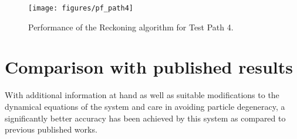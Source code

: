 \begin{figure}
    \centering
    \texttt{[image: figures/pf\_path4]}
    \caption{Performance of the Reckoning algorithm for Test Path 4.\label{fig:pf_path4}}
\end{figure}



\section{Comparison with published results}

With additional information at hand as well as suitable modifications to the 
dynamical equations of the system and care in avoiding particle degeneracy,
a significantly better accuracy has been achieved by this system as compared
to previous published works. 

